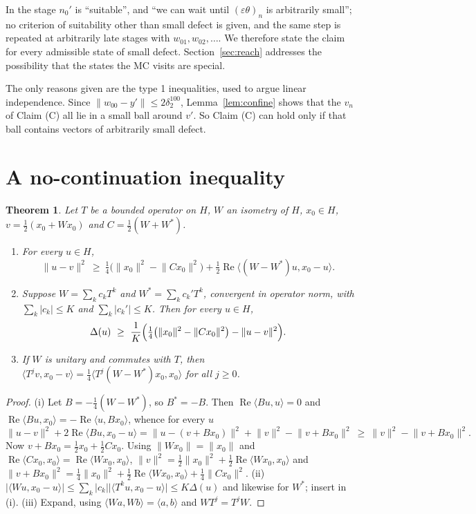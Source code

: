 \documentclass[11pt]{article}
\newtheorem{theorem}{Theorem}
\theoremstyle{definition}
\newcommand{\ip}[2]{\langle #1,#2\rangle}
\newcommand{\norm}[1]{\lVert #1\rVert}
\newcommand{\abs}[1]{\lvert #1\rvert}
\newcommand{\re}{\operatorname{Re}}
\begin{document}
In \cite{E} the stage $n_0'$ is ``suitable'', and ``we can wait until $(\varepsilon\theta)_n$
is arbitrarily small''; no criterion of suitability other than small defect is given, and the
same step is repeated at arbitrarily late stages with $w_{01},w_{02},\dots$. We therefore
state the claim for every admissible state of small defect. Section~\ref{sec:reach} addresses
the possibility that the states the MC visits are special.

The only reasons given are the type 1 inequalities, used to argue linear independence. Since
$\norm{w_{00}-y'}\le2\delta_2^{100}$, Lemma~\ref{lem:confine} shows that the $v_n$ of Claim (C)
all lie in a small ball around $v'$. So Claim (C) can hold only if that ball contains vectors
of arbitrarily small defect.

\section{A no-continuation inequality}

\begin{theorem}\label{thm:nogo}
Let $T$ be a bounded operator on $H$, $W$ an isometry of $H$, $x_0\in H$,
$v=\frac12(x_0+Wx_0)$ and $C=\frac12(W+W^*)$.
\begin{enumerate}[label=\textup{(\roman*)}]
\item For every $u\in H$,
\[
\norm{u-v}^2\ \ge\ \tfrac14\bigl(\norm{x_0}^2-\norm{Cx_0}^2\bigr)
+\tfrac12\re\ip{(W-W^*)u}{x_0-u}.
\]
\item Suppose $W=\sum_kc_kT^k$ and $W^*=\sum_kc_k'T^k$, convergent in operator norm, with
$\sum_k\abs{c_k}\le K$ and $\sum_k\abs{c_k'}\le K$. Then for every $u\in H$,
\[
\Delta(u)\ \ge\ \frac1K\Bigl(\tfrac14\bigl(\norm{x_0}^2-\norm{Cx_0}^2\bigr)-\norm{u-v}^2\Bigr).
\]
\item If $W$ is unitary and commutes with $T$, then
$\ip{T^jv}{x_0-v}=\frac14\ip{T^j(W-W^*)x_0}{x_0}$ for all $j\ge0$.
\end{enumerate}
\end{theorem}
\begin{proof}
(i) Let $B=-\frac14(W-W^*)$, so $B^*=-B$. Then $\re\ip{Bu}{u}=0$ and
$\re\ip{Bu}{x_0}=-\re\ip{u}{Bx_0}$, whence for every $u$
\[
\norm{u-v}^2+2\re\ip{Bu}{x_0-u}=\norm{u-(v+Bx_0)}^2+\norm v^2-\norm{v+Bx_0}^2
\ \ge\ \norm v^2-\norm{v+Bx_0}^2 .
\]
Now $v+Bx_0=\frac12x_0+\frac12Cx_0$. Using $\norm{Wx_0}=\norm{x_0}$ and
$\re\ip{Cx_0}{x_0}=\re\ip{Wx_0}{x_0}$,
$\norm v^2=\frac12\norm{x_0}^2+\frac12\re\ip{Wx_0}{x_0}$ and
$\norm{v+Bx_0}^2=\frac14\norm{x_0}^2+\frac12\re\ip{Wx_0}{x_0}+\frac14\norm{Cx_0}^2$.
(ii) $\abs{\ip{Wu}{x_0-u}}\le\sum_k\abs{c_k}\abs{\ip{T^ku}{x_0-u}}\le K\Delta(u)$ and likewise
for $W^*$; insert in (i). (iii) Expand, using $\ip{Wa}{Wb}=\ip ab$ and $WT^j=T^jW$.
\end{proof}
\end{document}
